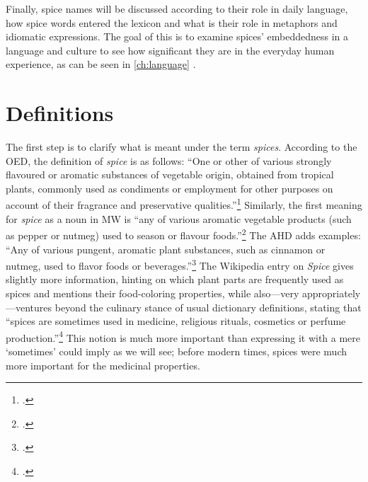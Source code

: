 
Finally, spice names will be discussed according to their role in daily language, how spice words entered the lexicon and what is their role in metaphors and idiomatic expressions. The goal of this is to examine spices' embeddedness in a language and culture to see how significant they are in the everyday human experience, as can be seen in \cref{ch:language} . 



\section{Definitions}
\label{sec:definitions}

The first step is to clarify what is meant under the term \textit{spices}. According to the \gls{OED}, the definition of \textit{spice} is as follows: ``One or other of various strongly flavoured or aromatic substances of vegetable origin, obtained from tropical plants, commonly used as condiments or employment for other purposes on account of their fragrance and preservative qualities.''\footcite[spice]{oed} Similarly, the first meaning for \textit{spice} as a noun in \gls{MW} is ``any of various aromatic vegetable products (such as pepper or nutmeg) used to season or flavour foods.''\footcite[spice]{mw} The \gls{AHD} adds examples: ``Any of various pungent, aromatic plant substances, such as cinnamon or nutmeg, used to flavor foods or beverages.''\footcite[spice]{ahd} 
The Wikipedia entry on \textit{Spice} gives slightly more information, hinting on which plant parts are frequently used as spices and mentions their food-coloring properties, while also---very appropriately---ventures beyond the culinary stance of usual dictionary definitions, stating that ``spices are sometimes used in medicine, religious rituals, cosmetics or perfume production.''\footcite{wikipedia_spice_2022} This notion is much more important than expressing it with a mere `sometimes' could imply as we will see; before modern times, spices were much more important for the medicinal properties.

